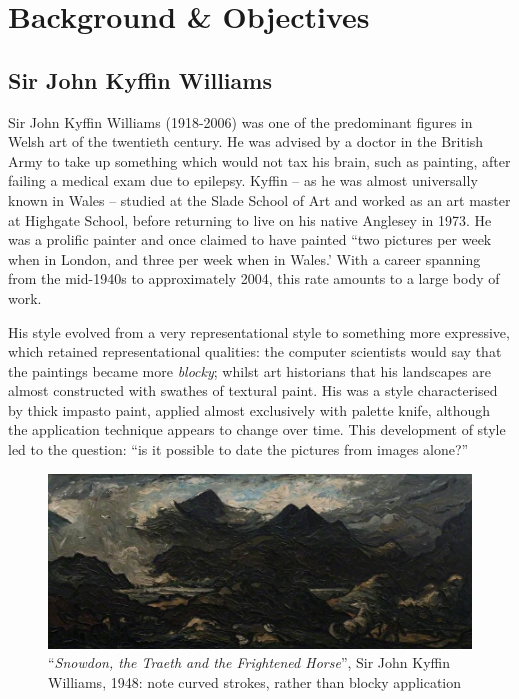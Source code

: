 \chapter{Background \& Objectives}


\section{Sir John Kyffin Williams}

Sir John Kyffin Williams (1918-2006) was one of the predominant figures in Welsh art of the
twentieth century.  He was advised by a doctor in the British Army to take up something which
would not tax his brain, such as painting, after failing a medical exam due to epilepsy. Kyffin --
as he was almost universally known in Wales -- studied at the Slade School of Art and worked as an
art master at Highgate School, before returning to live on his native Anglesey in 1973.  He was a
prolific painter and once claimed to have painted ``two pictures per week when in London, and 
three per week when in Wales.'\cite[p.209]{Williams1993Across} With a career spanning from the 
mid-1940s to approximately 2004, this rate amounts to a large body of work.

His style evolved from a very representational style to something more
expressive, which retained representational qualities: the computer scientists
would say that the paintings became more \emph{blocky}; whilst art
historians that his landscapes are almost constructed with swathes of textural
paint. His was a style characterised by thick impasto paint, applied almost
exclusively with palette knife, although the application technique appears to
change over time. This development of style led to the question: ``is it possible to
date the pictures from images alone?''

\begin{figure}[h]
\includegraphics[width=\linewidth]{img/snowdon_horse.jpeg}
\caption[``\emph{Snowdon, the Traeth and the Frightened Horse}'']{``\emph{Snowdon, the Traeth and the Frightened Horse}'', Sir John Kyffin Williams, 1948: note curved strokes, rather than blocky application}\label{early_example}
\end{figure}


